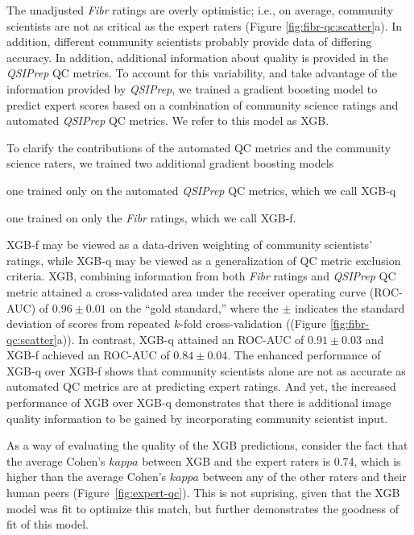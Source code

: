 \documentclass[fleqn,10pt]{wlscirep}
\begin{document}
The unadjusted \emph{Fibr} ratings are overly optimistic; i.e., on average,
community scientists are not as critical as the expert raters (Figure
\ref{fig:fibr-qc:scatter}a). In addition, different community scientists
probably provide data of differing accuracy. In addition, additional information
about quality is provided in the \emph{QSIPrep} QC metrics. To account for this
variability, and take advantage of the information provided by \emph{QSIPrep},
we trained a gradient boosting model \cite{chen2016-eb} to predict expert scores
based on a combination of community science ratings and automated \emph{QSIPrep}
QC metrics. We refer to this model as XGB.

To clarify the contributions of the automated QC metrics and the community
science raters, we trained two additional gradient boosting models
\begin{enumerate*}[%
    label=(\roman*),%
    before=\unskip{: },%
    itemjoin={{, }},%
    itemjoin*={{ and }}]
    \item one trained only on the automated \emph{QSIPrep} QC metrics, which we
    call XGB-q
    \item one trained on only the \emph{Fibr} ratings, which we call XGB-f.
\end{enumerate*}

XGB-f may be viewed as a data-driven weighting of community scientists' ratings,
while XGB-q may be viewed as a generalization of QC metric exclusion criteria.
XGB, combining information from both \emph{Fibr} ratings and \emph{QSIPrep} QC
metric attained a cross-validated area under the receiver operating curve
(ROC-AUC) of $0.96 \pm 0.01$ on the ``gold standard,'' where the $\pm$ indicates
the standard deviation of scores from repeated $k$-fold cross-validation
((Figure \ref{fig:fibr-qc:scatter}a)). In contrast, XGB-q attained an ROC-AUC of
$0.91 \pm 0.03$ and XGB-f achieved an ROC-AUC of $0.84 \pm 0.04$. The enhanced
performance of XGB-q over XGB-f shows that community scientists alone are not as
accurate as automated QC metrics are at predicting expert ratings. And yet, the
increased performance of XGB over XGB-q demonstrates that there is additional
image quality information to be gained by incorporating community scientist input.

As a way of evaluating the quality of the XGB predictions, consider the fact
that the average Cohen's $kappa$ between XGB and the expert raters is 0.74,
which is higher than the average Cohen's $kappa$ between any of the other raters
and their human peers (Figure~\ref{fig:expert-qc}). This is not suprising,
given that the XGB model was fit to optimize this match, but further
demonstrates the goodness of fit of this model.
\end{document}
